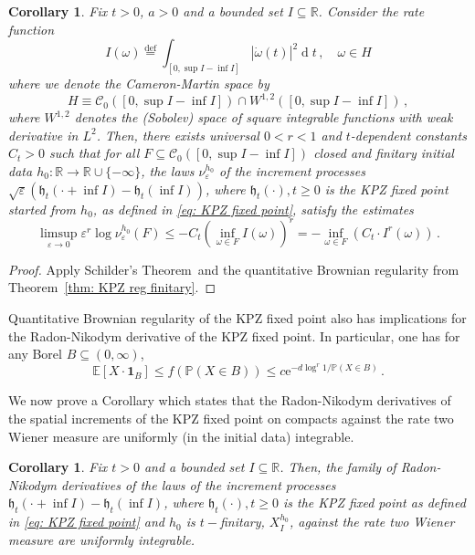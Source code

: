 \documentclass[11pt, reqno]{amsart}
\numberwithin{equation}{section}
\newcounter{dummy} \numberwithin{dummy}{section}
\newtheorem{corollary}[dummy]{Corollary}
\newcommand{\R}{\ensuremath{\mathbb{R}}}
\newcommand{\PP}{\ensuremath{\mathbb{P}}}
\newcommand{\diff}{\ensuremath{\operatorname{d}\!}}
\begin{document}
\begin{corollary}\label{cor: ldp one sided}
    Fix $t>0$, $a> 0$ and a bounded set $I\subseteq \R$. Consider the rate function
    \begin{equation*}
      I(\omega) \stackrel{\mathrm{def}}{=}\displaystyle\int_{[0, \sup I -\inf I]}|\dot{\omega}(t)|^2\diff t\,, \quad \omega \in H
    \end{equation*}
    where we denote the Cameron-Martin space by 
    \[
    H \equiv \mathscr{C}_0([0, \sup I -\inf I ])\cap W^{1,2}([0, \sup I -\inf I ])\,,
    \]
    where $W^{1,2}$ denotes the (Sobolev) space of square integrable functions with weak derivative in $L^2$.
    Then, there exists universal $0<r<1$ and $t$-dependent constants $C_t>0$ such that for all $F\subseteq \mathscr{C}_0([0, \sup I -\inf I])$ closed and finitary initial data $h_0:\R\to \R\cup\{-\infty\}$, the laws $\nu^{h_0}_\varepsilon$ of the increment processes $\sqrt{\varepsilon}(\mathfrak{h}_t(\cdot + \inf I) - \mathfrak{h}_t(\inf I))$, where $\mathfrak{h}_t(\cdot), t\ge 0$ is the KPZ fixed point started from $h_0$, as defined in \eqref{eq: KPZ fixed point}, satisfy the estimates
    \begin{equation*}
    \displaystyle\limsup_{\varepsilon\to 0}\varepsilon^r\log\nu^{h_0}_\varepsilon (F) \le -C_t\left(\inf_{\omega\in F}I(\omega)\right)^r = -\inf_{\omega\in F}\left(C_t\cdot I^r(\omega)\right)\,.
    \end{equation*}
\end{corollary}
\begin{proof}
    Apply Schilder's Theorem~and the quantitative Brownian regularity from Theorem~\ref{thm: KPZ reg finitary}.
\end{proof}
\color{black}

Quantitative Brownian regularity of the KPZ fixed point also has implications for the Radon-Nikodym derivative of the KPZ fixed point. In particular, one has for any Borel  $B\subseteq (0,\infty)$,
\begin{equation*}
\mathbb{E}[X\cdot \mathbf{1}_B]\le f(\PP(X\in B))\le c \mathrm{e}^{-d\log^r 1/\PP(X\in B)}\,.
\end{equation*}

We now prove a Corollary which states that the Radon-Nikodym derivatives of the spatial increments of the KPZ fixed point on compacts against the rate two Wiener measure are uniformly (in the initial data) integrable.
\begin{corollary}\label{cor: uniform integrability KPZ fixed point increments}
   Fix $t>0$ and a bounded set $I\subseteq \R$. Then, the family of Radon-Nikodym derivatives of the laws of the increment processes $\mathfrak{h}_t(\cdot + \inf I) - \mathfrak{h}_t(\inf I)$, where $\mathfrak{h}_t(\cdot), t\ge 0$ is the KPZ fixed point as defined in \eqref{eq: KPZ fixed point} and $h_0$ is $t-$finitary, $X^{h_0}_I$, against the rate two Wiener measure are uniformly integrable. 
\end{corollary}
\end{document}
